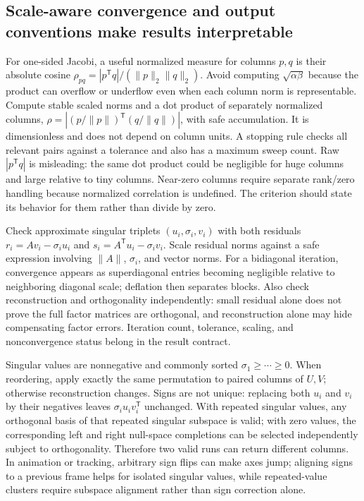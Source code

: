 \subsection{Scale-aware convergence and output conventions make results interpretable}\label{scale-aware-convergence-and-output-conventions-make-results-interpretable}

For one-sided Jacobi, a useful normalized measure for columns \(p,q\) is their absolute cosine \(\rho_{pq}=|p^\mathsf Tq|/(\|p\|_2\|q\|_2)\). Avoid computing \(\sqrt{\alpha\beta}\) because the product can overflow or underflow even when each column norm is representable. Compute stable scaled norms and a dot product of separately normalized columns, \(\rho=|(p/\|p\|)^\mathsf T(q/\|q\|)|\), with safe accumulation. It is dimensionless and does not depend on column units. A stopping rule checks all relevant pairs against a tolerance and also has a maximum sweep count. Raw \(|p^\mathsf Tq|\) is misleading: the same dot product could be negligible for huge columns and large relative to tiny columns. Near-zero columns require separate rank/zero handling because normalized correlation is undefined. The criterion should state its behavior for them rather than divide by zero.

Check approximate singular triplets \((u_i,\sigma_i,v_i)\) with both residuals \(r_i=Av_i-\sigma_i u_i\) and \(s_i=A^\mathsf Tu_i-\sigma_i v_i\). Scale residual norms against a safe expression involving \(\|A\|\), \(\sigma_i\), and vector norms. For a bidiagonal iteration, convergence appears as superdiagonal entries becoming negligible relative to neighboring diagonal scale; deflation then separates blocks. Also check reconstruction and orthogonality independently: small residual alone does not prove the full factor matrices are orthogonal, and reconstruction alone may hide compensating factor errors. Iteration count, tolerance, scaling, and nonconvergence status belong in the result contract.

Singular values are nonnegative and commonly sorted \(\sigma_1\ge\cdots\ge0\). When reordering, apply exactly the same permutation to paired columns of \(U,V\); otherwise reconstruction changes. Signs are not unique: replacing both \(u_i\) and \(v_i\) by their negatives leaves \(\sigma_i u_iv_i^\mathsf T\) unchanged. With repeated singular values, any orthogonal basis of that repeated singular subspace is valid; with zero values, the corresponding left and right null-space completions can be selected independently subject to orthogonality. Therefore two valid runs can return different columns. In animation or tracking, arbitrary sign flips can make axes jump; aligning signs to a previous frame helps for isolated singular values, while repeated-value clusters require subspace alignment rather than sign correction alone.

